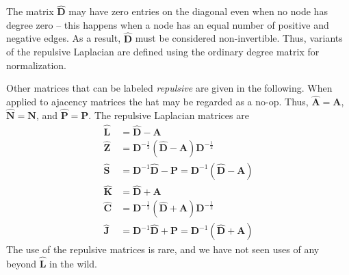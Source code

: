 \documentclass{article}
\begin{document}
The matrix $\mathbf{\hat D}$ may have zero entries on the diagonal even
when no node has degree zero -- this happens when a node has an equal
number of positive and negative edges.  As a result, $\mathbf{\hat D}$
must be considered non-invertible.  Thus, variants of the repulsive
Laplacian are defined using the ordinary degree matrix for
normalization.

Other matrices that can be labeled \emph{repulsive} are given in the
following. 
When applied to ajacency matrices the hat may be regarded as a no-op.
Thus, $\mathbf{\hat A}=\mathbf A$, $\mathbf{\hat N}=\mathbf N$, and $\mathbf{\hat P}=\mathbf P$.
The repulsive Laplacian matrices are 
\begin{align}
  \mathbf{\hat L} &= \mathbf{\hat D} - \mathbf A \\
  \mathbf{\hat Z} &= \mathbf D^{-\frac 12} (\mathbf{\hat D} - \mathbf A) \mathbf D^{-\frac 12} \\
  \mathbf{\hat S} &= \mathbf D^{-1} \mathbf{\hat D} - \mathbf P = \mathbf D^{-1}(\mathbf{\hat D} - \mathbf A) \\
  \mathbf{\hat K} &= \mathbf{\hat D} + \mathbf A \\
  \mathbf{\hat C} &= \mathbf D^{-\frac 12} (\mathbf{\hat D} + \mathbf A) \mathbf D^{-\frac 12} \\
  \mathbf{\hat J} &= \mathbf D^{-1} \mathbf{\hat D} + \mathbf P = \mathbf D^{-1}(\mathbf{\hat D} + \mathbf A) 
\end{align}
The use of the repulsive matrices is rare, and we have not seen uses of
any beyond $\mathbf{\hat L}$ in the wild.  
\end{document}
